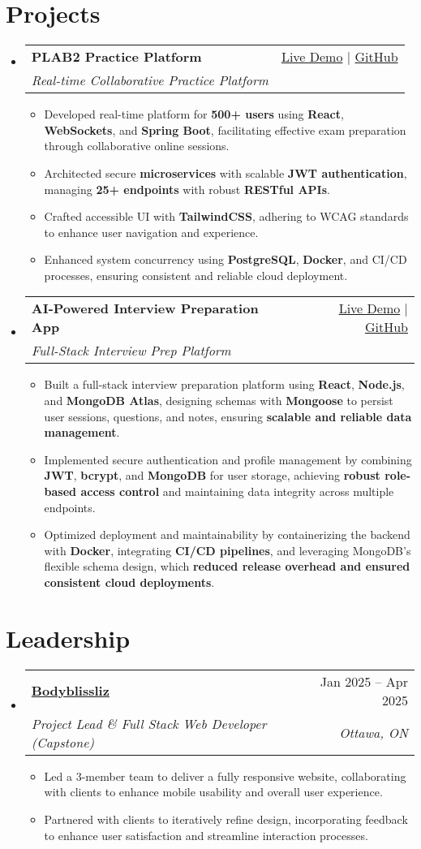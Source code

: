 \documentclass[letterpaper,11pt]{article}
\makeatletter
\newcommand{\resumeItem}[1]{\item\small{#1 \vspace{-2pt}}}
\newcommand{\resumeSubheading}[4]{
  \vspace{-1pt}\item
    \begin{tabular*}{0.97\textwidth}[t]{l@{\extracolsep{\fill}}r}
      \textbf{#1} & #2 \\
      \textit{\small#3} & \textit{\small #4} \\
    \end{tabular*}\vspace{-5pt}
}
\newcommand{\resumeSubHeadingListStart}{\begin{itemize}[leftmargin=*]}
\newcommand{\resumeSubHeadingListEnd}{\end{itemize}}
\newcommand{\resumeItemListStart}{\begin{itemize}}
\newcommand{\resumeItemListEnd}{\end{itemize}\vspace{-5pt}}
\makeatother
\begin{document}
\section{Projects}
  \resumeSubHeadingListStart
    \resumeSubheading
      {\textbf{PLAB2 Practice Platform}}{\href{https://plab2practice.com?utm_source=mongodb\&utm_medium=resume\&utm_campaign=job_application}{Live Demo} | \href{https://github.com/altansaid/plab2projectnew}{GitHub}}
      {Real-time Collaborative Practice Platform}{}
      \resumeItemListStart
        \resumeItem{Developed real-time platform for \textbf{500+ users} using \textbf{React}, \textbf{WebSockets}, and \textbf{Spring Boot}, facilitating effective exam preparation through collaborative online sessions.}
        \resumeItem{Architected secure \textbf{microservices} with scalable \textbf{JWT authentication}, managing \textbf{25+ endpoints} with robust \textbf{RESTful APIs}.}
        \resumeItem{Crafted accessible UI with \textbf{TailwindCSS}, adhering to WCAG standards to enhance user navigation and experience.}
        \resumeItem{Enhanced system concurrency using \textbf{PostgreSQL}, \textbf{Docker}, and CI/CD processes, ensuring consistent and reliable cloud deployment.}
      \resumeItemListEnd

    \resumeSubheading
      {\textbf{AI-Powered Interview Preparation App}}{\href{https://interviewcoach-ai.vercel.app}{Live Demo} | \href{https://github.com/altansaid/interviewcoach-ai}{GitHub}}
      {Full-Stack Interview Prep Platform}{}
      \resumeItemListStart
    \resumeItem{Built a full-stack interview preparation platform using \textbf{React}, \textbf{Node.js}, and \textbf{MongoDB Atlas}, designing schemas with \textbf{Mongoose} to persist user sessions, questions, and notes, ensuring \textbf{scalable and reliable data management}.}
    \resumeItem{Implemented secure authentication and profile management by combining \textbf{JWT}, \textbf{bcrypt}, and \textbf{MongoDB} for user storage, achieving \textbf{robust role-based access control} and maintaining data integrity across multiple endpoints.}
    \resumeItem{Optimized deployment and maintainability by containerizing the backend with \textbf{Docker}, integrating \textbf{CI/CD pipelines}, and leveraging MongoDB’s flexible schema design, which \textbf{reduced release overhead and ensured consistent cloud deployments}.}
      \resumeItemListEnd
  \resumeSubHeadingListEnd

\section{Leadership}
  \resumeSubHeadingListStart
    \resumeSubheading
      {\href{https://www.bodyblissliz.com}{Bodyblissliz}}{Jan 2025 -- Apr 2025}
      {Project Lead \& Full Stack Web Developer (Capstone)}{Ottawa, ON}
      \resumeItemListStart
        \resumeItem{Led a 3-member team to deliver a fully responsive website, collaborating with clients to enhance mobile usability and overall user experience.}
        \resumeItem{Partnered with clients to iteratively refine design, incorporating feedback to enhance user satisfaction and streamline interaction processes.}
      \resumeItemListEnd
  \resumeSubHeadingListEnd
\end{document}
